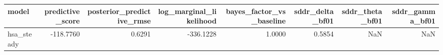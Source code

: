 \begin{tabular}{lrrrrrrr}
\toprule
model & predictive\_score & posterior\_predictive\_rmse & log\_marginal\_likelihood & bayes\_factor\_vs\_baseline & sddr\_delta\_bf01 & sddr\_theta\_bf01 & sddr\_gamma\_bf01 \\
\midrule
hsa\_steady & -118.7760 & 0.6291 & -336.1228 & 1.0000 & 0.5854 & NaN & NaN \\
\bottomrule
\end{tabular}

